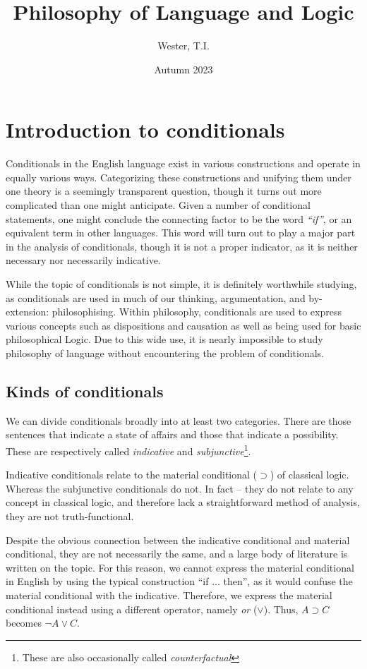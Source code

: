 \documentclass[12pt]{report}
\title{Philosophy of Language and Logic}
\date{Autumn 2023}
\author{Wester, T.I.}
\begin{document}
\maketitle
\tableofcontents

\chapter{Introduction to conditionals}

Conditionals in the English language exist in various constructions and operate
in equally various ways. Categorizing these constructions and unifying them
under one theory is a seemingly transparent question, though it turns out more
complicated than one might anticipate.  Given a number of conditional
statements, one might conclude the connecting factor to be the word \emph{``if''},
or an equivalent term in other languages. This word will turn out to play a
major part in the analysis of conditionals, though it is not a proper indicator,
as it is neither necessary nor necessarily indicative.

While the topic of conditionals is not simple, it is definitely worthwhile
studying, as conditionals are used in much of our thinking, argumentation, and
by-extension: philosophising. Within philosophy, conditionals are used to
express various concepts such as dispositions and causation as well as being
used for basic philosophical Logic. Due to this wide use, it is nearly
impossible to study philosophy of language without encountering the problem of
conditionals.

\section{Kinds of conditionals}

We can divide conditionals broadly into at least two categories. There are those
sentences that indicate a state of affairs and those that indicate a
possibility. These are respectively called \emph{indicative} and
\emph{subjunctive}\footnote{These are also occasionally called
\emph{counterfactual}}.

Indicative conditionals relate to the material conditional ($\supset$) of
classical logic. Whereas the subjunctive conditionals do not. In fact -- they do
not relate to any concept in classical logic, and therefore lack a
straightforward method of analysis, they are not truth-functional.

Despite the obvious connection between the indicative conditional and material
conditional, they are not necessarily the same, and a large body of literature
is written on the topic.  For this reason, we cannot express the material
conditional in English by using the typical construction ``if ... then'', as it
would confuse the material conditional with the indicative. Therefore, we
express the material conditional instead using a different operator, namely
\emph{or} ($\lor$). Thus, $A \supset C$ becomes $\lnot A \lor C$.
\end{document}
